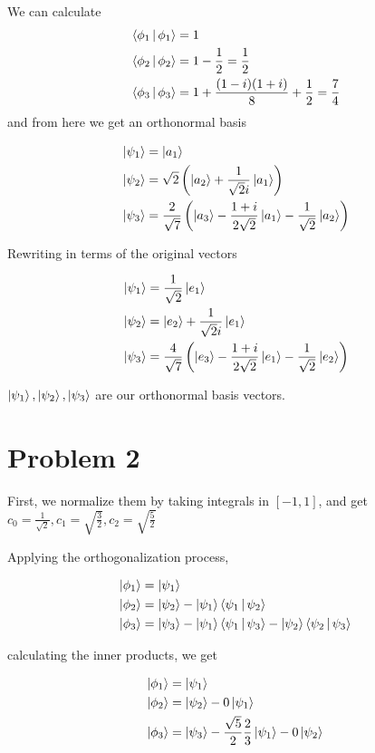 \documentclass[12pt]{article}
\begin{document}
We can calculate \begin{align*}&\Braket{\phi_1|\phi_1}=1\\
&\Braket{\phi_2|\phi_2}=1-\frac{1}{2}=\frac12\\ &\Braket{\phi_3|\phi_3}=1+\frac{(1-i)(1+i)}{8}+\frac12=\frac74
\end{align*}
and from here we get an orthonormal basis

\begin{align*}
&\Ket{\psi_1}=\Ket{a_1}\\
&\Ket{\psi_2}=\sqrt{2}\left(\Ket{a_2}+\frac{1}{\sqrt{2}i}\Ket{a_1}\right)\\
&\Ket{\psi_3}=\frac{2}{\sqrt{7}}\left(\Ket{a_3}-\frac{1+i}{2\sqrt{2}}\Ket{a_1}-\frac{1}{\sqrt{2}}\Ket{a_2}\right)\\
\end{align*}

Rewriting in terms of the original vectors

\begin{align*}
&\Ket{\psi_1}=\frac{1}{\sqrt{2}}\Ket{e_1}\\
&\Ket{\psi_2}=\Ket{e_2}+\frac{1}{\sqrt{2}i}\Ket{e_1}\\
&\Ket{\psi_3}=\frac{4}{\sqrt{7}}\left(\Ket{e_3}-\frac{1+i}{2\sqrt{2}}\Ket{e_1}-\frac{1}{\sqrt{2}}\Ket{e_2}\right)\\
\end{align*}

$\Ket{\psi_1},\Ket{\psi_2},\Ket{\psi_3}$ are our orthonormal basis vectors.

\section*{Problem 2}
First, we normalize them by taking integrals in $[-1,1]$, and get $c_0=\frac1{\sqrt{2}},c_1=\sqrt{\frac32},c_2=\sqrt{\frac52}$

Applying the orthogonalization process,

\begin{align*}
\Ket{\phi_1}&=\Ket{\psi_1}\\
\Ket{\phi_2}&=\Ket{\psi_2}-\Ket{\psi_1}\Braket{\psi_1|\psi_2}\\
\Ket{\phi_3}&=\Ket{\psi_3}-\Ket{\psi_1}\Braket{\psi_1|\psi_3}-\Ket{\psi_2}\Braket{\psi_2|\psi_3}
\end{align*}

calculating the inner products, we get

\begin{align*}
\Ket{\phi_1}&=\Ket{\psi_1}\\
\Ket{\phi_2}&=\Ket{\psi_2}-0\Ket{\psi_1}\\
\Ket{\phi_3}&=\Ket{\psi_3}-\frac{\sqrt5}{2}\frac23\Ket{\psi_1}-0\Ket{\psi_2}
\end{align*}
\end{document}
